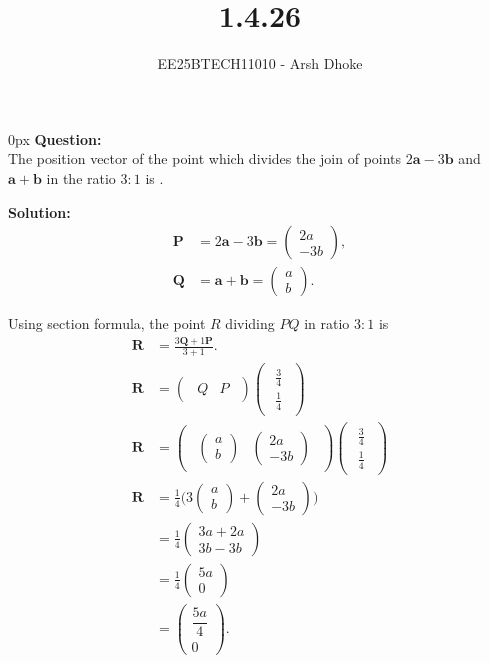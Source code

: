 \documentclass[journal]{IEEEtran}
\renewcommand{\vec}[1]{\mathbf{#1}}
\newcommand{\solution}{\textbf{Solution: }}
\newcommand{\brak}[1]{\begin{pmatrix}#1\end{pmatrix}}
\begin{document}

\vspace{3cm}

\title{1.4.26}
\author{EE25BTECH11010 - Arsh Dhoke}
{\let\newpage\relax\maketitle}

\renewcommand{\thefigure}{\theenumi}
\renewcommand{\thetable}{\theenumi}
\setlength{\intextsep}{10pt}

\parindent 0px
\textbf{Question:} \\
The position vector of the point which divides the join of points $2\vec{a} - 3\vec{b}$ and $\vec{a} + \vec{b}$ in the ratio $3:1$ is \underline{\hspace{2cm}}.

\solution \\

\begin{align}
\vec{P} &= 2\vec{a} - 3\vec{b}
   = \brak{2a\\-3b}, \\
\vec{Q} &= \vec{a} + \vec{b}
   = \brak{a\\b}.
\end{align}

Using section formula, the point $R$ dividing $PQ$ in ratio $3:1$ is
\begin{align}
\vec{R} &= \frac{3\vec{Q} + 1\vec{P}}{3+1}. \\
\vec{R} &= \brak{\begin{matrix}Q & P\end{matrix}}\brak{\begin{matrix}\frac{3}{4} \\[6pt]\frac{1}{4}\end{matrix}} \\
\vec{R} &= \brak{\begin{matrix}\brak{a \\ b} & \brak{2a \\ -3b}\end{matrix}}\brak{\begin{matrix}\frac{3}{4} \\[6pt]\frac{1}{4}\end{matrix}} \\
\vec{R}
&= \frac{1}{4}\Big(3\brak{a\\b}+\brak{2a\\-3b}\Big) \\[6pt]
&= \frac{1}{4}\brak{3a+2a\\3b-3b} \\[6pt]
&= \frac{1}{4}\brak{5a\\0} \\[6pt]
&= \brak{\dfrac{5a}{4}\\0}.
\end{align}
\end{document}
